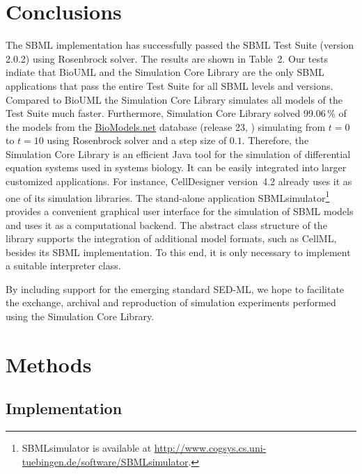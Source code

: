 \documentclass[10pt]{bmc_article}
\newenvironment{bmcformat}{\baselineskip20pt\sloppy\setboolean{publ}{false}}{\baselineskip20pt\sloppy}
\begin{document}
\begin{bmcformat}
\section*{Conclusions}
The SBML implementation has successfully passed the
SBML Test Suite (version 2.0.2) using Rosenbrock solver.
The results are shown in Table~2.
Our tests indiate that BioUML and the Simulation Core Library are the only SBML applications that pass the entire Test Suite for all SBML levels and versions.
Compared to BioUML the Simulation Core Library simulates all models of the Test Suite much faster.
Furthermore, Simulation Core Library solved 99.06\,\% of the models from the
\href{http://biomodels.net}{BioModels.net} database (release 23,
\cite{Novere2006a}) simulating from $t = 0$ to $t = 10$ using Rosenbrock solver and a step size of $0.1$.
Therefore, the Simulation Core Library is an efficient Java tool for the
simulation of differential equation systems used in systems biology. It can be
easily integrated into larger customized applications.
For instance, CellDesigner version~4.2 \cite{Funahashi2003} already uses it as one of its simulation libraries.
The stand-alone application SBMLsimulator\footnote{SBMLsimulator is available at
\url{http://www.cogsys.cs.uni-tuebingen.de/software/SBMLsimulator}.}
provides a convenient graphical user interface for the simulation of SBML
models and uses it as a computational backend.
The abstract class structure of the library supports the integration of
additional model formats, such as CellML, besides its SBML implementation. To
this end, it is only necessary to implement a suitable interpreter class.


By including support for the emerging standard SED-ML, we hope to facilitate the
exchange, archival and reproduction of simulation experiments performed using
the Simulation Core Library.

\section*{Methods}

\subsection*{Implementation}


\end{bmcformat}
\end{document}
